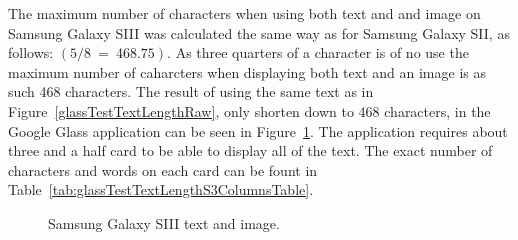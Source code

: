 The maximum number of characters when using both text and and image on Samsung Galaxy SIII was calculated the same way as for Samsung Galaxy SII, as follows: \((5/8~=~468.75)\). As three quarters of a character is of no use the maximum number of caharcters when displaying both text and an image is as such 468 characters. The result of using the same text as in Figure~\ref{glassTestTextLengthRaw}, only shorten down to 468 characters, in the Google Glass application can be seen in Figure~\ref{glassTestTextLengthS3Columns}. The application requires about three and a half card to be able to display all of the text. The exact number of characters and words on each card can be fount in Table~\ref{tab:glassTestTextLengthS3ColumnsTable}.

	\begin{figure}[H]%
		\centering
   		 \qquad
   		 \qquad
   		 \qquad
   		 \qquad
		\caption{Samsung Galaxy SIII text and image.}
		\label{glassTestTextLengthS3Columns}
	\end{figure}

